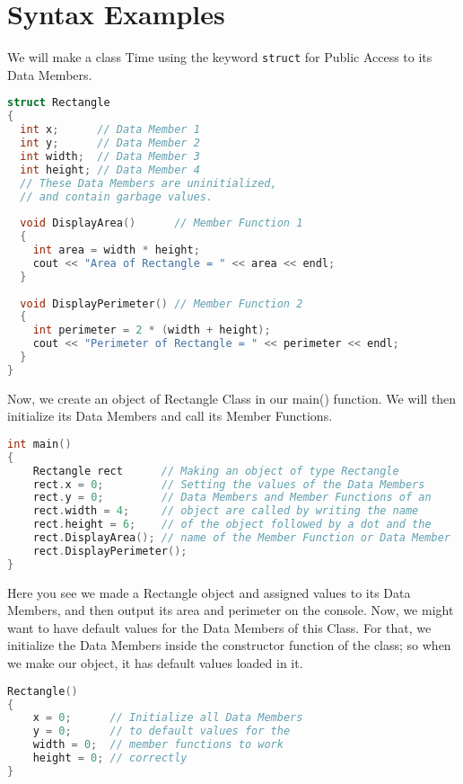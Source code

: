 \documentclass[11pt,fleqn]{book} %
\begin{document}
\section{Syntax Examples}

We will make a class Time using the keyword \texttt{struct} for Public Access to its Data Members.

\begin{lstlisting}[language=C++, caption=Class Definition using the \texttt{struct} keyword in C++]
struct Rectangle
{
  int x;      // Data Member 1
  int y;      // Data Member 2
  int width;  // Data Member 3
  int height; // Data Member 4
  // These Data Members are uninitialized,
  // and contain garbage values.
  
  void DisplayArea()      // Member Function 1
  {
    int area = width * height;
    cout << "Area of Rectangle = " << area << endl;
  }
  
  void DisplayPerimeter() // Member Function 2
  {
    int perimeter = 2 * (width + height);
    cout << "Perimeter of Rectangle = " << perimeter << endl;
  }
}
\end{lstlisting}

\noindent Now, we create an object of Rectangle Class in our main() function. We will then initialize its Data Members and call its Member Functions.

\begin{lstlisting}[language=C++, caption=Making an Object using the Class and using its Data Members and Functions]
int main()
{
	Rectangle rect      // Making an object of type Rectangle
	rect.x = 0;         // Setting the values of the Data Members
	rect.y = 0;         // Data Members and Member Functions of an
	rect.width = 4;     // object are called by writing the name 
	rect.height = 6;    // of the object followed by a dot and the  
	rect.DisplayArea(); // name of the Member Function or Data Member
	rect.DisplayPerimeter();
}
\end{lstlisting}

\noindent Here you see we made a Rectangle object and assigned values to its Data Members, and then output its area and perimeter on the console. Now, we might want to have default values for the Data Members of this Class. For that, we initialize the Data Members inside the constructor function of the class; so when we make our object, it has default values loaded in it. 

\begin{lstlisting}[language=C++, caption={Default Class Constructor, to be defined inside the Class Body}]
Rectangle()
{
	x = 0;      // Initialize all Data Members
	y = 0;      // to default values for the 
	width = 0;  // member functions to work
	height = 0; // correctly
}
\end{lstlisting}
\end{document}
